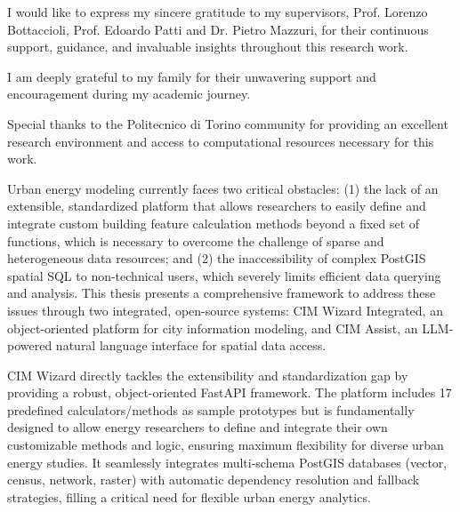 \documentclass[a4paper,11pt,twoside,english]{toptesi}
\begin{document}
\english





\frontespizio %

\ringraziamenti

I would like to express my sincere gratitude to my supervisors, Prof. Lorenzo Bottaccioli, Prof. Edoardo Patti and Dr. Pietro Mazzuri, for their continuous support, guidance, and invaluable insights throughout this research work.

I am deeply grateful to my family for their unwavering support and encouragement during my academic journey.

Special thanks to the Politecnico di Torino community for providing an excellent research environment and access to computational resources necessary for this work.

\abstract

Urban energy modeling currently faces two critical obstacles: (1) the lack of an extensible, standardized platform that allows researchers to easily define and integrate custom building feature calculation methods beyond a fixed set of functions, which is necessary to overcome the challenge of sparse and heterogeneous data resources; and (2) the inaccessibility of complex PostGIS spatial SQL to non-technical users, which severely limits efficient data querying and analysis. This thesis presents a comprehensive framework to address these issues through two integrated, open-source systems: CIM Wizard Integrated, an object-oriented platform for city information modeling, and CIM Assist, an LLM-powered natural language interface for spatial data access.

CIM Wizard directly tackles the extensibility and standardization gap by providing a robust, object-oriented FastAPI framework. The platform includes 17 predefined calculators/methods as sample prototypes but is fundamentally designed to allow energy researchers to define and integrate their own customizable methods and logic, ensuring maximum flexibility for diverse urban energy studies. It seamlessly integrates multi-schema PostGIS databases (vector, census, network, raster) with automatic dependency resolution and fallback strategies, filling a critical need for flexible urban energy analytics.
\end{document}
